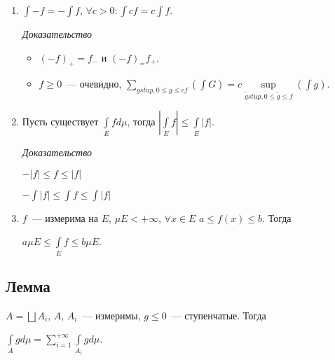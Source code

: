 \documentclass{article}
\begin{document}
\begin{enumerate}
\begin{itemize}
                    \end{itemize}
                    
            \item $\int -f = - \int f$, $\forall c > 0 : \int cf = c \int f$.
            
                \textit{Доказательство}
                
                    \begin{itemize}
                    
                        \item $(-f)_+ = f_-$ и $(-f)_ = f_+$.
                    
                        \item $f \geqslant 0$~--- очевидно, $\sum\limits_{g stup, 0 \leqslant g \leqslant cf} \left( \int G \right) = c \sup\limits_{\widetilde{g} stup, 0 \leqslant \widetilde{g} \leqslant f} \left( \int g \right)$.
                        
                    \end{itemize}
                    
            \item Пусть существует $\int\limits_{E} f d \mu$, тогда $\left| \int\limits_{E} f \right| \leqslant \int\limits_{E} |f|$.
            
                \textit{Доказательство}
                
                    $- |f| \leqslant f \leqslant |f|$
                    
                    $- \int |f| \leqslant \int f \leqslant \int |f|$
                    
            \item $f$~--- измерима на $E$, $\mu E < +\infty$, $\forall x \in E$ $a \leqslant f(x) \leqslant b$. Тогда 
            
                $a \mu E \leqslant \int\limits_{E} f \leqslant b \mu E$.
                
        \end{enumerate}
        
    \subsection{Лемма}
    
        $A = \bigsqcup A_i$, $A$, $A_i$~--- измеримы, $g \leqslant 0$~--- ступенчатые. Тогда
        
        $\int\limits_{A} g d \mu = \sum\limits_{i = 1}^{+\infty} \int\limits_{A_i} g d \mu$.
        
\end{document}
